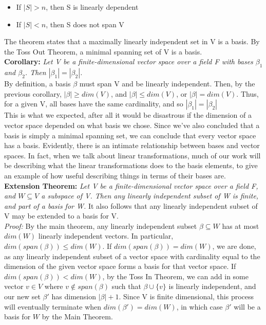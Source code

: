 \documentclass[12pt]{article}
\begin{document}
\begin{itemize}
\item If $|S| > n$, then S is linearly dependent
\item If $|S| < n$, then S does not span V
\end{itemize}
The theorem states that a maximally linearly independent set in V is a basis. By the Toss Out Theorem, a minimal spanning set of V is a basis.\\

\textbf{Corollary: }\emph{Let V be a finite-dimensional vector space over a field F with bases $\beta_1$ and $\beta_2$. Then $|\beta_1| = |\beta_2|$.}\\

By definition, a basis $\beta$ must span V and be linearly independent. Then, by the previous corollary, $|\beta| \geq dim(V)$, and $|\beta| \leq dim(V)$, or $|\beta| = dim(V)$. Thus, for a given V, all bases have the same cardinality, and so $|\beta_1| = |\beta_2|$\\

This is what we expected, after all it would be disastrous if the dimension of a vector space depended on what basis we chose. Since we've also concluded that a basis is simply a minimal spanning set, we can conclude that every vector space has a basis. Evidently, there is an intimate relationship between bases and vector spaces. In fact, when we talk about linear transformations, much of our work will be describing what the linear transformations does to the basis elements, to give an example of how useful describing things in terms of their bases are.
\clearpage
\textbf{Extension Theorem: }\emph{Let V be a finite-dimensional vector space over a field F, and $W \subseteq V$ a subspace of V. Then any linearly independent subset of W is finite, and part of a basis for W.} It also follows that any linearly independent subset of V may be extended to a basis for V.\\

\emph{Proof: }By the main theorem, any linearly independent subset $\beta \subseteq W$ has at most $dim(W)$ linearly independent vectors. In particular, $dim(span(\beta)) \leq dim(W)$. If $dim(span(\beta)) = dim(W)$, we are done, as any linearly independent subset of a vector space with cardinality equal to the dimension of the given vector space forms a basis for that vector space. If $dim(span(\beta)) < dim(W)$, by the Toss In Theorem, we can add in some vector $v \in V$ where $v \notin span(\beta)$ such that $\beta \cup \{ v \}$ is linearly independent, and our new set $\beta'$ has dimension $|\beta| + 1$. Since V is finite dimensional, this process will eventually terminate when $dim(\beta') = dim(W)$, in which case $\beta'$ will be a basis for $W$ by the Main Theorem.\\
\end{document}
